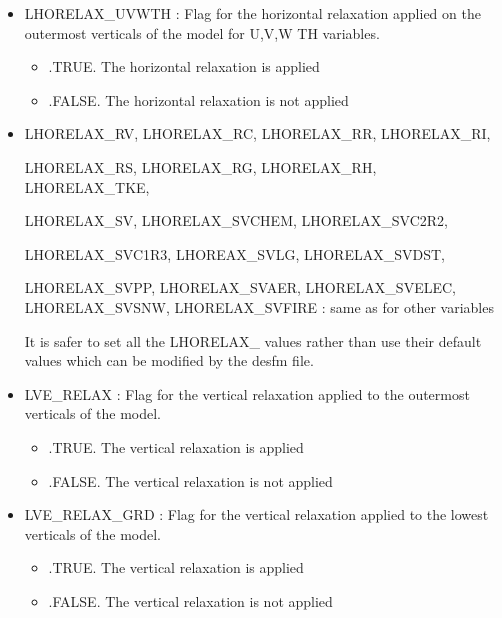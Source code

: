 \begin{itemize}
\item
{}
LHORELAX\_UVWTH : Flag for the horizontal relaxation applied on the
outermost verticals of the model for U,V,W TH variables. 
\begin{itemize}
\item   .TRUE. The horizontal  relaxation is applied 
\item   .FALSE. The horizontal  relaxation is not applied 
\end{itemize}

\item
{}
LHORELAX\_RV, LHORELAX\_RC, LHORELAX\_RR, LHORELAX\_RI,


LHORELAX\_RS, LHORELAX\_RG, LHORELAX\_RH, LHORELAX\_TKE,


LHORELAX\_SV, LHORELAX\_SVCHEM, LHORELAX\_SVC2R2,


LHORELAX\_SVC1R3, LHOREAX\_SVLG, LHORELAX\_SVDST,


LHORELAX\_SVPP, LHORELAX\_SVAER, LHORELAX\_SVELEC, LHORELAX\_SVSNW, LHORELAX\_SVFIRE  : same as for other variables

It is safer to set all the LHORELAX\_ values rather than
use their default values which can be modified by the desfm file.

\item
{}
LVE\_RELAX : Flag for the vertical relaxation applied to the outermost
verticals of the model. 
\begin{itemize}
\item   .TRUE. The vertical  relaxation is applied 
\item   .FALSE. The vertical    relaxation is not applied 
\end{itemize}

\item
{}
LVE\_RELAX\_GRD : Flag for the vertical relaxation applied to the lowest
verticals of the model. 
\begin{itemize}
\item   .TRUE. The vertical  relaxation is applied 
\item   .FALSE. The vertical    relaxation is not applied 
\end{itemize}



\end{itemize}
